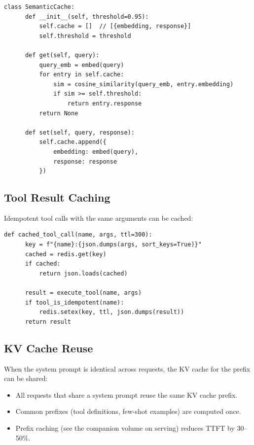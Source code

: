 \begin{lstlisting}[caption=Semantic cache for agent responses]
  class SemanticCache:
      def __init__(self, threshold=0.95):
          self.cache = []  // [{embedding, response}]
          self.threshold = threshold

      def get(self, query):
          query_emb = embed(query)
          for entry in self.cache:
              sim = cosine_similarity(query_emb, entry.embedding)
              if sim >= self.threshold:
                  return entry.response
          return None

      def set(self, query, response):
          self.cache.append({
              embedding: embed(query),
              response: response
          })
\end{lstlisting}

\subsection{Tool Result Caching}

Idempotent tool calls with the same arguments can be cached:

\begin{lstlisting}[caption=Tool result cache]
  def cached_tool_call(name, args, ttl=300):
      key = f"{name}:{json.dumps(args, sort_keys=True)}"
      cached = redis.get(key)
      if cached:
          return json.loads(cached)

      result = execute_tool(name, args)
      if tool_is_idempotent(name):
          redis.setex(key, ttl, json.dumps(result))
      return result
\end{lstlisting}

\subsection{KV Cache Reuse}

When the system prompt is identical across requests, the KV cache for the prefix can be shared:

\begin{itemize}
	\item All requests that share a system prompt reuse the same KV cache prefix.
	\item Common prefixes (tool definitions, few-shot examples) are computed once.
	\item Prefix caching (see the companion volume on serving) reduces TTFT by 30--50\%.
\end{itemize}

